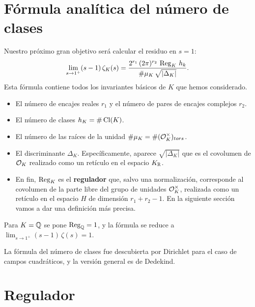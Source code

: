 
\section{Fórmula analítica del número de clases}

Nuestro próximo gran objetivo será calcular el residuo en $s = 1$:
\[ \lim_{s \to 1^+} (s - 1)\,\zeta_K (s) =
   \frac{2^{r_1}\,(2\pi)^{r_2}\,\operatorname{Reg}_K\,h_k}{\#\mu_K\,\sqrt{|\Delta_K|}}. \]
Esta fórmula contiene todos los invariantes básicos de $K$ que hemos
considerado.
\begin{itemize}
\item El número de encajes reales $r_1$ y el número de pares de encajes
  complejos $r_2$.

\item El número de clases $h_K = \# \operatorname{Cl} (K)$.

\item El número de las raíces de la unidad $\# \mu_K = \# (\mathcal{O}_K^\times)_{tors}$.

\item El discriminante $\Delta_K$. Específicamente, aparece $\sqrt{|\Delta_K|}$
  que es el covolumen de $\mathcal{O}_K$ realizado como un retículo en el espacio
  $K_{\mathbb{R}}$.

\item En fin, $\operatorname{Reg}_K$ es el \textbf{regulador} que, salvo una normalización,
  corresponde al covolumen de la parte libre del grupo de unidades
  $\mathcal{O}_K^\times$, realizada como un retículo en el espacio $H$ de dimensión
  $r_1 + r_2 - 1$. En la siguiente sección vamos a dar una definición más
  precisa.
\end{itemize}

Para $K = \mathbb{Q}$ se pone $\operatorname{Reg}_{\mathbb{Q}} = 1$, y la fórmula se reduce a
$\lim_{s \to 1^+} (s - 1)\,\zeta (s) = 1$.

\vspace{1em}

La fórmula del número de clases fue descubierta por Dirichlet para el caso de
campos cuadráticos, y la versión general es de Dedekind.


\section{Regulador}

